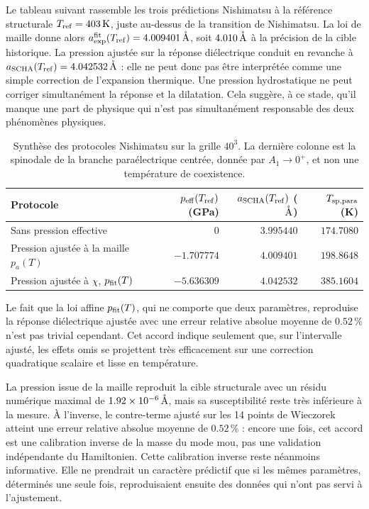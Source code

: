 Le tableau suivant rassemble les trois prédictions Nishimatsu à la référence
structurale $T_{\rm ref}=403\,\mathrm K$, juste au-dessus de la transition de
Nishimatsu. La loi de maille donne alors
$a_{\rm exp}^{\rm fit}(T_{\rm ref})=4.009401\,\mathring{\rm A}$, soit
$4.010\,\mathring{\rm A}$ à la précision de la cible historique. La pression
ajustée sur la réponse diélectrique conduit en revanche à
$a_{\rm SCHA}(T_{\rm ref})=4.042532\,\mathring{\rm A}$ : elle ne peut donc
pas être interprétée comme une simple correction de l'expansion thermique.
Une pression hydrostatique ne peut corriger simultanément la réponse et la
dilatation. Cela suggère, à ce stade, qu'il manque une part de physique qui n'est
pas simultanément responsable des deux phénomènes physiques.
\begin{table}[H]
\centering
\small
\caption{Synthèse des protocoles Nishimatsu sur la grille $40^3$.
La dernière colonne est la spinodale de la branche paraélectrique centrée,
donnée par $A_1\to0^+$, et non une température de coexistence.}
\label{tab:core_three_pressure_predictions}
\renewcommand{\arraystretch}{1.15}
\begin{tabular}{p{}r r r}
\hline
Protocole & $p_{\rm eff}(T_{\rm ref})$ (GPa) &
$a_{\rm SCHA}(T_{\rm ref})$ ($\mathring{\rm A}$) &
$T_{\rm sp,para}$ (K) \\
\hline
Sans pression effective & $0$ & $3.995440$ & $174.7080$ \\
Pression ajustée à la maille $p_a(T)$ & $-1.707774$ & $4.009401$ & $198.8648$ \\
Pression ajustée à $\chi$, $p_{\rm fit}(T)$ & $-5.636309$ & $4.042532$ & $385.1604$ \\
\hline
\end{tabular}
\end{table}
Le fait que la loi affine $p_{\rm fit}(T)$, qui ne comporte que deux
paramètres, reproduise la réponse diélectrique ajustée avec une erreur relative
absolue moyenne de $0.52\,\%$ n'est pas trivial cependant. Cet accord indique seulement que, sur l'intervalle ajusté, les effets
omis se projettent très efficacement sur une correction quadratique scalaire
et lisse en température.

La pression issue de la
maille reproduit la cible structurale avec un résidu numérique maximal de
$1.92\times10^{-6}\,\mathring{\rm A}$, mais sa susceptibilité reste très
inférieure à la mesure. À l'inverse, le contre-terme ajusté sur les 14 points
de Wieczorek atteint une erreur relative absolue moyenne de $0.52\,\%$ : encore une fois, cet
accord est une calibration inverse de la masse du mode mou,
pas une validation indépendante du Hamiltonien. Cette calibration inverse reste
néanmoins informative. Elle ne prendrait un caractère prédictif que si les mêmes
paramètres, déterminés une seule fois, reproduisaient ensuite des données qui
n'ont pas servi à l'ajustement.

